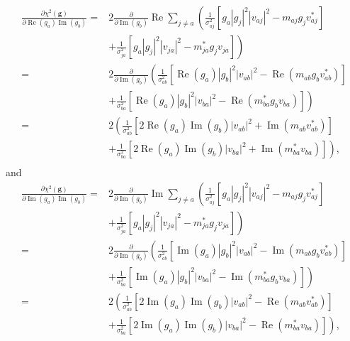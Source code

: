 \documentclass{article}
\newcommand\re{\operatorname{Re}}
\newcommand\im{\operatorname{Im}}
\begin{document}
\begin{equation}
\begin{split}
    \frac{\partial \chi^2(\boldsymbol{g})}{\partial \re(g_a) \im(g_b)} = & 2 \frac{\partial}{\partial \im(g_b)} \re \sum_{j \ne a} 
    \left( \frac{1}{\sigma_{aj}^2} \left[ g_a |g_j|^2 |v_{aj}|^2 - m_{aj} g_j v_{aj}^* \right] \right. \\
    &\left. + \frac{1}{\sigma_{ja}^2} \left[ g_a |g_j|^2 |v_{ja}|^2 - m_{ja}^* g_j v_{ja} \right] \right) \\
    =& 2 \frac{\partial}{\partial \im(g_b)} 
    \left( \frac{1}{\sigma_{ab}^2} \left[ \re(g_a) |g_b|^2 |v_{ab}|^2 - \re(m_{ab} g_b v_{ab}^*) \right] \right. \\
    &\left. + \frac{1}{\sigma_{ba}^2} \left[ \re(g_a) |g_b|^2 |v_{ba}|^2 - \re(m_{ba}^* g_b v_{ba}) \right] \right) \\
    =& 2
    \left( \frac{1}{\sigma_{ab}^2} \left[ 2 \re(g_a) \im(g_b) |v_{ab}|^2 + \im(m_{ab} v_{ab}^*) \right] \right. \\
    &\left. + \frac{1}{\sigma_{ba}^2} \left[ 2\re(g_a) \im(g_b) |v_{ba}|^2 + \im(m_{ba}^* v_{ba}) \right] \right), \\
\end{split}
\end{equation}
and
\begin{equation}
\begin{split}
    \frac{\partial \chi^2(\boldsymbol{g})}{\partial \im(g_a) \im(g_b)} = & 2 \frac{\partial}{\partial \im(g_b)} \im \sum_{j \ne a} 
    \left( \frac{1}{\sigma_{aj}^2} \left[ g_a |g_j|^2 |v_{aj}|^2 - m_{aj} g_j v_{aj}^* \right] \right. \\
    &\left. + \frac{1}{\sigma_{ja}^2} \left[ g_a |g_j|^2 |v_{ja}|^2 - m_{ja}^* g_j v_{ja} \right] \right) \\
    =& 2 \frac{\partial}{\partial \im(g_b)} 
    \left( \frac{1}{\sigma_{ab}^2} \left[ \im(g_a) |g_b|^2 |v_{ab}|^2 - \im(m_{ab} g_b v_{ab}^*) \right] \right. \\
    &\left. + \frac{1}{\sigma_{ba}^2} \left[ \im(g_a) |g_b|^2 |v_{ba}|^2 - \im(m_{ba}^* g_b v_{ba}) \right] \right) \\
    =& 2
    \left( \frac{1}{\sigma_{ab}^2} \left[ 2 \im(g_a) \im(g_b) |v_{ab}|^2 - \re(m_{ab} v_{ab}^*) \right] \right. \\
    &\left. + \frac{1}{\sigma_{ba}^2} \left[ 2\im(g_a) \im(g_b) |v_{ba}|^2 - \re(m_{ba}^* v_{ba}) \right] \right), \\
\end{split}
\end{equation}
\end{document}
